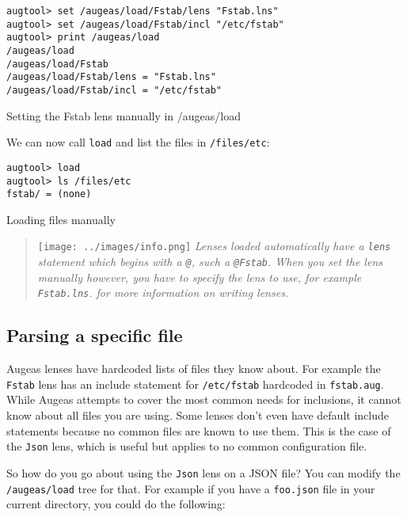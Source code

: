 

\begin{listing}
  \begin{verbatim}
augtool> set /augeas/load/Fstab/lens "Fstab.lns"
augtool> set /augeas/load/Fstab/incl "/etc/fstab"
augtool> print /augeas/load
/augeas/load
/augeas/load/Fstab
/augeas/load/Fstab/lens = "Fstab.lns"
/augeas/load/Fstab/incl = "/etc/fstab"
  \end{verbatim}
  \caption{Setting the Fstab lens manually in /augeas/load}
  \label{lst:metadata_setting_lens_manually}
\end{listing}

We can now call \verb!load! and list the files in \nolinkurl{/files/etc}:

 

\begin{listing}
  \begin{verbatim}
augtool> load
augtool> ls /files/etc
fstab/ = (none)
  \end{verbatim}
  \caption{Loading files manually}
  \label{lst:metadata_call_load}
\end{listing}

\begin{quote}
\texttt{[image: ../images/info.png]} \emph{Lenses loaded automatically have a \texttt{lens} statement which begins with a \texttt{@}, such a \texttt{@Fstab}. When you set the lens manually however, you have to specify the lens to use, for example \texttt{Fstab.lns}.  for more information on writing lenses.}

\end{quote}
\subsection{Parsing a specific file}

Augeas lenses have hardcoded lists of files they know about. For example the \verb!Fstab! lens has an include statement for \nolinkurl{/etc/fstab} hardcoded in \verb!fstab.aug!. While Augeas attempts to cover the most common needs for inclusions, it cannot know about all files you are using. Some lenses don't even have default include statements because no common files are known to use them. This is the case of the \verb!Json! lens, which is useful but applies to no common configuration file.

So how do you go about using the \verb!Json! lens on a JSON file? You can modify the \nolinkurl{/augeas/load} tree for that. For example if you have a \verb!foo.json! file in your current directory, you could do the following:

